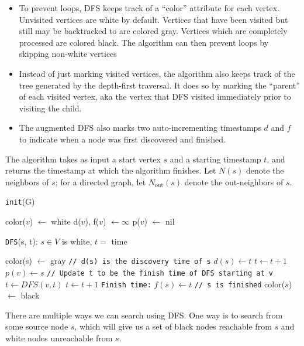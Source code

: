 \documentclass [12pt]{article}
\begin{document}
\begin{itemize}
  \item To prevent loops, DFS keeps track of a ``color'' attribute for each vertex. Unvisited vertices are white by default. Vertices that have been visited but still may be backtracked to are colored gray. Vertices which are completely processed are colored black. The algorithm can then prevent loops by skipping non-white vertices
  \item Instead of just marking visited vertices, the algorithm also keeps track of the tree generated by the depth-first traversal. It does so by marking the ``parent'' of each visited vertex, aka the vertex that DFS visited immediately prior to visiting the child.
  \item The augmented DFS also marks two auto-incrementing timestamps $d$ and $f$ to indicate when a node was first discovered and finished.
\end{itemize}

The algorithm takes as input a start vertex $s$ and a starting timestamp $t$, and returns the timestamp at which the algorithm finishes. Let $N(s)$ denote the neighbors of $s$; for a directed graph, let $N_{\text{out}}(s)$ denote the out-neighbors of $s$.

\begin{algorithm}
\caption{\texttt{init}(G)}
\label{alg:init_G}
\begin{algorithmic}
\STATE color($v$) $\gets$ white
\STATE d($v$), f($v$) $\gets \infty$ 
\STATE p($v$) $\gets$ nil
\ENDFOR
\end{algorithmic}
\end{algorithm}

\begin{algorithm}
\caption{\texttt{DFS}(s, t): $s \in V$ is white, $t =$ time}
\label{alg:DFS_s_t}
\begin{algorithmic}
\STATE color(s) $\gets$ gray
\STATE \texttt{// d(s) is the discovery time of s}
\STATE $d(s) \gets t$
\STATE $t \gets t+1$
    \STATE $p(v) \gets s$
    \STATE \texttt{// Update t to be the finish time of DFS starting at v}
    \STATE $t \gets DFS(v,t)$
    \STATE $t \gets t + 1$
  \ENDIF
\ENDFOR
\STATE \texttt{Finish time:}
\STATE $f(s) \gets t$
\STATE \texttt{// s is finished}
\STATE color($s$) $\gets$ black
\end{algorithmic}
\end{algorithm}

There are multiple ways we can search using DFS. One way is to search from some source node $s$, which will give us a set of black nodes reachable from $s$ and white nodes unreachable from $s$.
\end{document}
